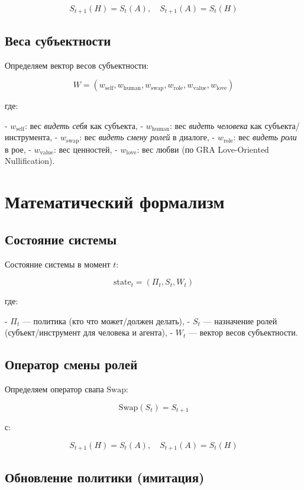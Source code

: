 \documentclass[11pt,a4paper]{article}
\begin{document}
\[
S_{t+1}(H) = S_t(A), \quad
S_{t+1}(A) = S_t(H)
\]

\subsection{Веса субъектности}

Определяем вектор весов субъектности:

\[
W = (w_{\text{self}}, w_{\text{human}}, w_{\text{swap}}, w_{\text{role}}, w_{\text{value}}, w_{\text{love}})
\]

где:

- \(w_{\text{self}}\): вес \textit{видеть себя} как субъекта,
- \(w_{\text{human}}\): вес \textit{видеть человека} как субъекта/инструмента,
- \(w_{\text{swap}}\): вес \textit{видеть смену ролей} в диалоге,
- \(w_{\text{role}}\): вес \textit{видеть роли} в рое,
- \(w_{\text{value}}\): вес ценностей,
- \(w_{\text{love}}\): вес любви (по GRA Love-Oriented Nullification).

\section{Математический формализм}

\subsection{Состояние системы}

Состояние системы в момент \(t\):

\[
\text{state}_t = (\Pi_t, S_t, W_t)
\]

где:

- \(\Pi_t\) — политика (кто что может/должен делать),
- \(S_t\) — назначение ролей (субъект/инструмент для человека и агента),
- \(W_t\) — вектор весов субъектности.

\subsection{Оператор смены ролей}

Определяем оператор свапа \(\text{Swap}\):

\[
\text{Swap}(S_t) = S_{t+1}
\]

с:

\[
S_{t+1}(H) = S_t(A), \quad
S_{t+1}(A) = S_t(H)
\]

\subsection{Обновление политики (имитация)}
\end{document}
